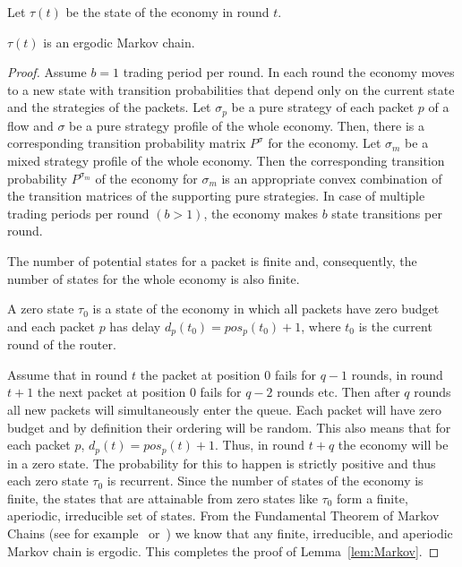 \documentclass[letterpaper,10pt]{llncs}
\newcommand{\hla}[1]{\hl{#1}}
\renewcommand{\hla}[1]{#1}
\begin{document}
\begin{definition}
Let $\tau(t)$ be the state of the economy in round $t$.
\end{definition}

\begin{lemma}
\label{lem:Markov}
$\tau(t)$ is an ergodic Markov chain.
\end{lemma}
\begin{proof}
Assume $b=1$ trading period per round.
In each round the economy moves to a new state with transition probabilities that depend only
on the current state and the strategies of the packets. Let $\sigma_p$ be a pure strategy of
each packet $p$ of a flow and $\sigma$ be a pure strategy profile of the whole economy. 
Then, there is a corresponding transition probability matrix $P^{\sigma}$ for the economy.
Let $\sigma_m$ be a mixed strategy profile of the whole economy. Then the corresponding
transition probability $P^{\sigma_m}$ of the economy for $\sigma_m$ 
is an appropriate convex combination of the transition matrices of the supporting pure strategies. 
In case of multiple trading periods per round $(b > 1)$, the economy makes $b$ state transitions 
per round.

The number of potential states for a packet is finite and, consequently, the number of states 
for the whole economy is also finite. 
\begin{definition}
\hla{A zero state $\tau_0$ is a state of the economy in which all packets have zero budget and each packet $p$ has delay $d_p(t_0) = pos_p(t_0) + 1$, where $t_0$ is the current round of the router. }
\end{definition}
Assume that in round $t$ the packet at position $0$ fails for $q-1$ rounds, in round $t+1$ the next packet at position $0$ fails for $q-2$ rounds etc. 
Then after $q$ rounds all new packets will simultaneously enter the queue. Each packet will have zero budget
and by definition their ordering will be random. This also means that for each packet $p$,  $d_p(t) = pos_p(t) + 1$. Thus, in round $t+q$ the economy will be in a zero state.
The probability for this to happen is strictly positive and thus each zero state $\tau_0$ is recurrent. Since the number of states of the economy is finite, the states that are attainable from zero states like $\tau_0$ form a finite, aperiodic, irreducible set of states. 
From the Fundamental Theorem of Markov Chains (see for example~\cite{Motwani:1995:RA} or~\cite{Mitzenmacher:2005:PCR}) we know that any finite, irreducible, and aperiodic Markov chain is ergodic. This completes the proof of Lemma~\ref{lem:Markov}.
\end{proof}
\end{document}
